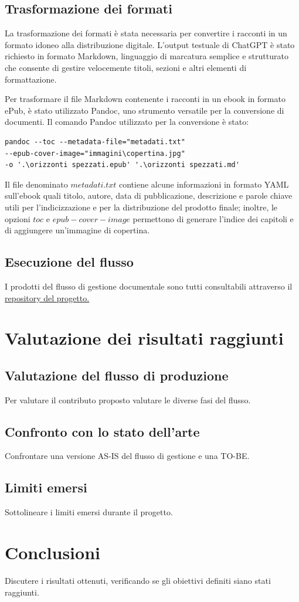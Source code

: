 \documentclass[a4paper,12pt]{article}
\begin{document}
\subsection*{Trasformazione dei formati}
La trasformazione dei formati è stata necessaria per convertire i racconti in un formato idoneo alla distribuzione digitale. L'output testuale di ChatGPT è stato richiesto in formato Markdown, linguaggio di marcatura semplice e strutturato che consente di gestire velocemente titoli, sezioni e altri elementi di formattazione.

\bigbreak

Per trasformare il file Markdown contenente i racconti in un ebook in formato ePub, è stato utilizzato Pandoc, uno strumento versatile per la conversione di documenti. Il comando Pandoc utilizzato per la conversione è stato:

\begin{lstlisting}
pandoc --toc --metadata-file="metadati.txt" 
--epub-cover-image="immagini\copertina.jpg"
-o '.\orizzonti spezzati.epub' '.\orizzonti spezzati.md'
\end{lstlisting}

Il file denominato $metadati.txt$ contiene alcune informazioni in formato YAML sull'ebook quali titolo, autore, data di pubblicazione, descrizione e parole chiave utili per l'indicizzazione e per la distribuzione del prodotto finale; inoltre, le opzioni $toc$ e $epub-cover-image$ permettono di generare l'indice dei capitoli e di aggiungere un'immagine di copertina.


\subsection*{Esecuzione del flusso}
I prodotti del flusso di gestione documentale sono tutti consultabili attraverso il \href{https://github.com/gianlucapironato/editoria_digitale/}{\underline{repository del progetto.}}

\section*{Valutazione dei risultati raggiunti}
\subsection*{Valutazione del flusso di produzione}
Per valutare il contributo proposto valutare le diverse fasi del flusso.

\subsection*{Confronto con lo stato dell’arte}
Confrontare una versione AS-IS del flusso di gestione e una TO-BE.

\subsection*{Limiti emersi}
Sottolineare i limiti emersi durante il progetto.

\section*{Conclusioni}
Discutere i risultati ottenuti, verificando se gli obiettivi definiti siano stati raggiunti.
\end{document}
